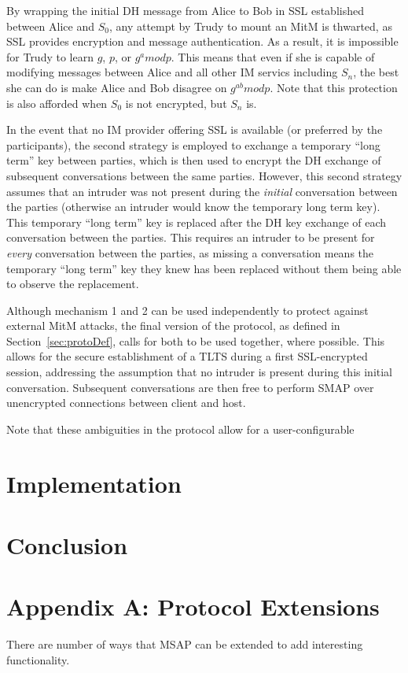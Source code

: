 \documentclass[twoside,10pt]{article}
\begin{document}
\begin{multicols}{2}
By wrapping the initial DH message from Alice to Bob in SSL established between Alice and $S_0$, any attempt by Trudy to mount an MitM is thwarted, as SSL provides encryption and message authentication.  As a result, it is impossible for Trudy to learn $g$, $p$, or $g^a mod p$.  This means that even if she is capable of modifying messages between Alice and all other IM servics including $S_n$, the best she can do is make Alice and Bob disagree on $g^{ab} mod p$.  Note that this protection is also afforded when $S_0$ is not encrypted, but $S_n$ is.

In the event that no IM provider offering SSL is available (or preferred by the participants), the second strategy is employed to exchange a temporary ``long term'' key between parties, which is then used to encrypt the DH exchange of subsequent conversations between the same parties.  However, this second strategy assumes that an intruder was not present during the \emph{initial} conversation between the parties (otherwise an intruder would know the temporary long term key).  This temporary ``long term'' key is replaced after the DH key exchange of each conversation between the parties.  This requires an intruder to be  present for \emph{every} conversation between the parties, as missing a conversation means the temporary ``long term'' key they knew has been replaced without them being able to observe the replacement.

Although mechanism 1 and 2 can be used independently to protect against external MitM attacks, the final version of the protocol, as defined in Section~\ref{sec:protoDef}, calls for both to be used together, where possible.  This allows for the secure establishment of a TLTS during a first SSL-encrypted session, addressing the assumption that no intruder is present during this initial conversation.  Subsequent conversations are then free to perform SMAP over unencrypted connections between client and host.

Note that these ambiguities in the protocol allow for a user-configurable 

\section{Implementation}

\section{Conclusion}

\section{Appendix A: Protocol Extensions}
There are number of ways that MSAP can be extended to add interesting functionality.  


\end{multicols}
\end{document}
